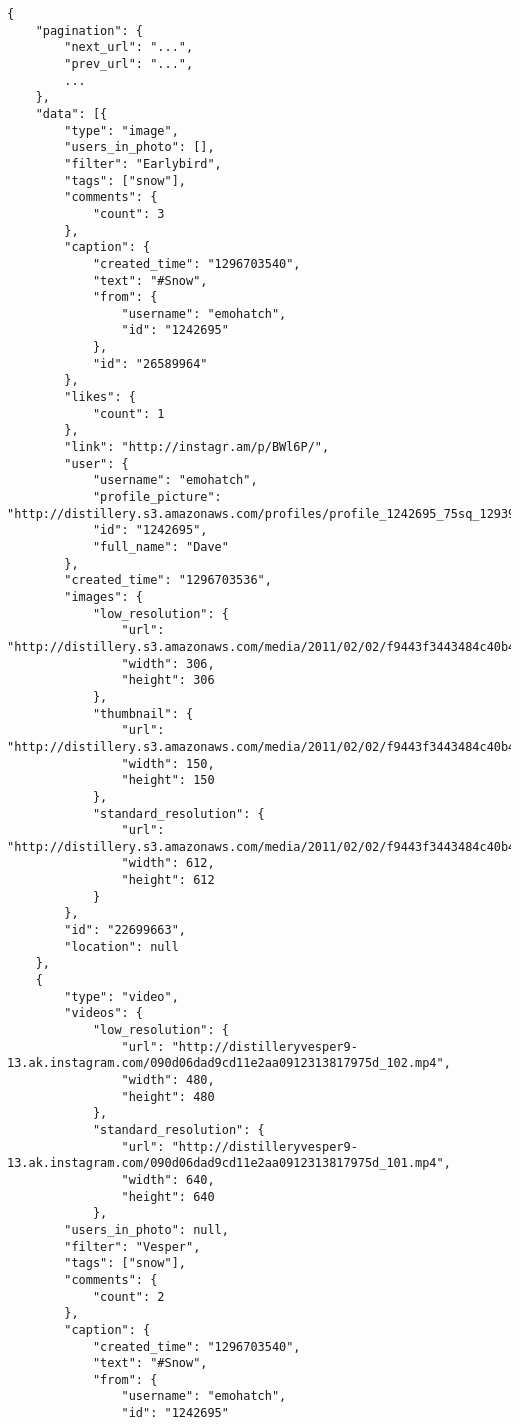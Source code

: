 \begin{lstlisting}[basicstyle=\tiny,caption=Response Tag Endpoint Media Recent,label={lst:response_tag_endpoint_media}]
	{
	"pagination": {
		"next_url": "...",
		"prev_url": "...",
		...
	},
    "data": [{
        "type": "image",
        "users_in_photo": [],
        "filter": "Earlybird",
        "tags": ["snow"],
        "comments": {
            "count": 3
        },
        "caption": {
            "created_time": "1296703540",
            "text": "#Snow",
            "from": {
                "username": "emohatch",
                "id": "1242695"
            },
            "id": "26589964"
        },
        "likes": {
            "count": 1
        },
        "link": "http://instagr.am/p/BWl6P/",
        "user": {
            "username": "emohatch",
            "profile_picture": "http://distillery.s3.amazonaws.com/profiles/profile_1242695_75sq_1293915800.jpg",
            "id": "1242695",
            "full_name": "Dave"
        },
        "created_time": "1296703536",
        "images": {
            "low_resolution": {
                "url": "http://distillery.s3.amazonaws.com/media/2011/02/02/f9443f3443484c40b4792fa7c76214d5_6.jpg",
                "width": 306,
                "height": 306
            },
            "thumbnail": {
                "url": "http://distillery.s3.amazonaws.com/media/2011/02/02/f9443f3443484c40b4792fa7c76214d5_5.jpg",
                "width": 150,
                "height": 150
            },
            "standard_resolution": {
                "url": "http://distillery.s3.amazonaws.com/media/2011/02/02/f9443f3443484c40b4792fa7c76214d5_7.jpg",
                "width": 612,
                "height": 612
            }
        },
        "id": "22699663",
        "location": null
    },
    {
        "type": "video",
        "videos": {
            "low_resolution": {
                "url": "http://distilleryvesper9-13.ak.instagram.com/090d06dad9cd11e2aa0912313817975d_102.mp4",
                "width": 480,
                "height": 480
            },
            "standard_resolution": {
                "url": "http://distilleryvesper9-13.ak.instagram.com/090d06dad9cd11e2aa0912313817975d_101.mp4",
                "width": 640,
                "height": 640
            },
        "users_in_photo": null,
        "filter": "Vesper",
        "tags": ["snow"],
        "comments": {
            "count": 2
        },
        "caption": {
            "created_time": "1296703540",
            "text": "#Snow",
            "from": {
                "username": "emohatch",
                "id": "1242695"

\end{lstlisting}

